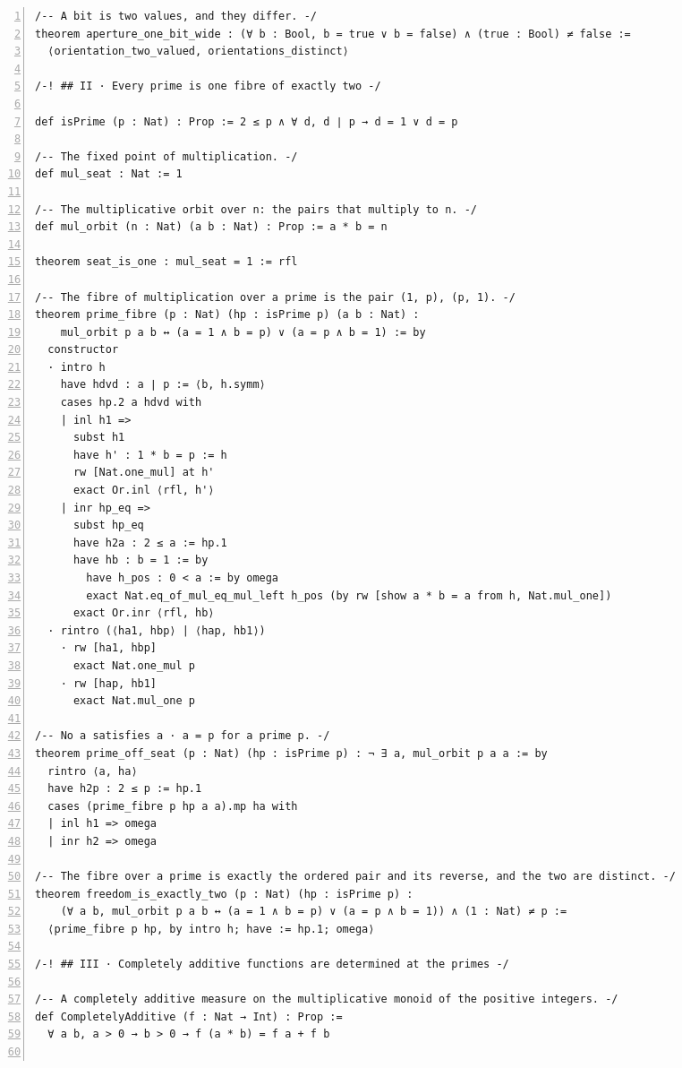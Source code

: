 \documentclass[10pt]{article}
\newcommand{\leansize}{\fontsize{5.5pt}{6.75pt}\selectfont}
\begin{document}
\begin{multicols}{2}
\begin{Verbatim}[numbers=left,firstnumber=1,numbersep=3pt,xleftmargin=2.6em,breaklines=true,breakanywhere=true,breakautoindent=false,breakindent=1.4em,breaksymbolleft={},breakanywheresymbolpre={},fontsize=\leansize]
/-- A bit is two values, and they differ. -/
theorem aperture_one_bit_wide : (∀ b : Bool, b = true ∨ b = false) ∧ (true : Bool) ≠ false :=
  ⟨orientation_two_valued, orientations_distinct⟩

/-! ## II · Every prime is one fibre of exactly two -/

def isPrime (p : Nat) : Prop := 2 ≤ p ∧ ∀ d, d ∣ p → d = 1 ∨ d = p

/-- The fixed point of multiplication. -/
def mul_seat : Nat := 1

/-- The multiplicative orbit over n: the pairs that multiply to n. -/
def mul_orbit (n : Nat) (a b : Nat) : Prop := a * b = n

theorem seat_is_one : mul_seat = 1 := rfl

/-- The fibre of multiplication over a prime is the pair (1, p), (p, 1). -/
theorem prime_fibre (p : Nat) (hp : isPrime p) (a b : Nat) :
    mul_orbit p a b ↔ (a = 1 ∧ b = p) ∨ (a = p ∧ b = 1) := by
  constructor
  · intro h
    have hdvd : a ∣ p := ⟨b, h.symm⟩
    cases hp.2 a hdvd with
    | inl h1 =>
      subst h1
      have h' : 1 * b = p := h
      rw [Nat.one_mul] at h'
      exact Or.inl ⟨rfl, h'⟩
    | inr hp_eq =>
      subst hp_eq
      have h2a : 2 ≤ a := hp.1
      have hb : b = 1 := by
        have h_pos : 0 < a := by omega
        exact Nat.eq_of_mul_eq_mul_left h_pos (by rw [show a * b = a from h, Nat.mul_one])
      exact Or.inr ⟨rfl, hb⟩
  · rintro (⟨ha1, hbp⟩ | ⟨hap, hb1⟩)
    · rw [ha1, hbp]
      exact Nat.one_mul p
    · rw [hap, hb1]
      exact Nat.mul_one p

/-- No a satisfies a · a = p for a prime p. -/
theorem prime_off_seat (p : Nat) (hp : isPrime p) : ¬ ∃ a, mul_orbit p a a := by
  rintro ⟨a, ha⟩
  have h2p : 2 ≤ p := hp.1
  cases (prime_fibre p hp a a).mp ha with
  | inl h1 => omega
  | inr h2 => omega

/-- The fibre over a prime is exactly the ordered pair and its reverse, and the two are distinct. -/
theorem freedom_is_exactly_two (p : Nat) (hp : isPrime p) :
    (∀ a b, mul_orbit p a b ↔ (a = 1 ∧ b = p) ∨ (a = p ∧ b = 1)) ∧ (1 : Nat) ≠ p :=
  ⟨prime_fibre p hp, by intro h; have := hp.1; omega⟩

/-! ## III · Completely additive functions are determined at the primes -/

/-- A completely additive measure on the multiplicative monoid of the positive integers. -/
def CompletelyAdditive (f : Nat → Int) : Prop :=
  ∀ a b, a > 0 → b > 0 → f (a * b) = f a + f b


\end{Verbatim}
\end{multicols}
\end{document}
